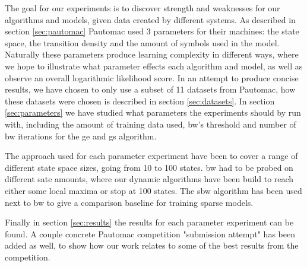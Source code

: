 The goal for our experiments is to discover strength and weaknesses for our algorithms and models, given data created by different systems. As described in section \ref{sec:pautomac} Pautomac used 3 parameters for their machines: the state space, the transition density and the amount of symbols used in the model. Naturally these parameters produce learning complexity in different ways, where we hope to illustrate what parameter effects each algorithm and model, as well as observe an overall logarithmic likelihood score. In an attempt to produce concise results, we have chosen to only use a subset of 11 datasets from Pautomac, how these datasets were chosen is described in section \ref{sec:datasets}. In section \ref{sec:parameters} we have studied what parameters the experiments should by run with, including the amount of training data used, \gls{bw}'s threshold and number of \gls{bw} iterations for the \gls{ge} and \gls{gs} algorithm. 

The approach used for each parameter experiment have been to cover a range of different state space sizes, going from 10 to 100 states. \gls{bw} had to be probed on different sate amounts, where our dynamic algorithms have been build to reach either some local maxima or stop at 100 states. The \gls{sbw} algorithm has been used next to \gls{bw} to give a comparison baseline for training sparse models.

Finally in section \ref{sec:results} the results for each parameter experiment can be found. A couple concrete Pautomac competition "submission attempt" has been added as well, to show how our work relates to some of the best results from the competition.